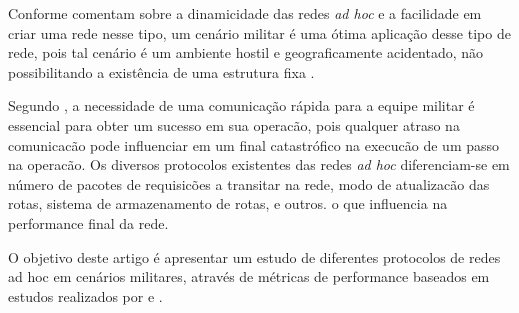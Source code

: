 Conforme \cite{pepe} comentam sobre a dinamicidade das redes \textit{ad hoc} e a facilidade em criar uma rede nesse tipo, um cen\'ario militar \'e uma \'otima aplica\c{c}\~ao desse tipo de rede, pois tal cen\'ario \'e um ambiente hostil e geograficamente acidentado, n\~ao possibilitando a exist\^encia de uma estrutura fixa \cite{schimidt}.

Segundo \cite{salles}, a necessidade de uma comunica\c{c}\~ao r\'apida para a equipe militar \'e essencial para obter um sucesso em sua operac\~ao, pois qualquer atraso na comunicac\~ao pode influenciar em um final catastr\'ofico na execuc\~ao de um passo na operac\~ao. 
Os diversos protocolos existentes das redes \textit{ad hoc} diferenciam-se em n\'umero de pacotes de requisic\~oes a transitar na rede, modo de atualizac\~ao das rotas, sistema de armazenamento de rotas, e outros. o que influencia na performance final da rede.

O objetivo deste artigo \'e apresentar um estudo de diferentes protocolos de redes ad hoc em cen\'arios militares, atrav\'es de m\'etricas de performance baseados em estudos realizados por \cite{pereira} e \cite{salles}.
